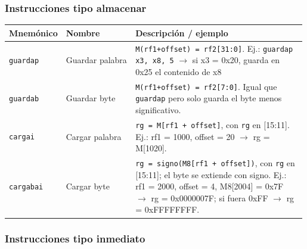 \subsubsection{Instrucciones tipo
almacenar}\label{instrucciones-tipo-almacenar}

\begin{longtable}[]{@{}p{0.15\linewidth}p{0.240\linewidth}p{0.6\linewidth}@{}}
\toprule\noalign{}
Mnemónico & Nombre & Descripción / ejemplo \\
\midrule\noalign{}
\endhead
\bottomrule\noalign{}
\endlastfoot
\texttt{guardap} & Guardar palabra &
\texttt{M(rf1+offset) = rf2[31:0]}. Ej.:
\texttt{guardap x3, x8, 5} $\rightarrow$ si x3 = 0x20, guarda en
0x25 el contenido de x8 \\
\texttt{guardab} & Guardar byte &
\texttt{M(rf1+offset) = rf2[7:0]}. Igual que
\texttt{guardap} pero solo guarda el byte menos
significativo. \\
\texttt{cargai} & Cargar palabra &
\texttt{rg = M[rf1 + offset]}, con
\texttt{rg} en {[}15:11{]}. Ej.: rf1 = 1000, offset =
20 $\rightarrow$ rg = M{[}1020{]}. \\
\texttt{cargabai} & Cargar byte &
\texttt{rg = signo(M8[rf1 + offset])}, con
\texttt{rg} en {[}15:11{]}; el byte se extiende con
signo. Ej.: rf1 = 2000, offset = 4, M8{[}2004{]} = 0x7F $\rightarrow$ rg =
0x0000007F; si fuera 0xFF $\rightarrow$ rg = 0xFFFFFFFF. \\
\end{longtable}

\subsubsection{Instrucciones tipo
inmediato}\label{instrucciones-tipo-inmediato}


